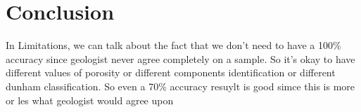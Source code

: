 \chapter{Conclusion}\label{chp:conclusion}
In Limitations, we can talk about the fact that we don't need to have a 100\% accuracy since geologist never agree completely on a sample. So it's okay to have different values of porosity or different components identification or different dunham classification. So even a 70\% accuracy resuylt is good simce this is more or les what geologist would agree upon